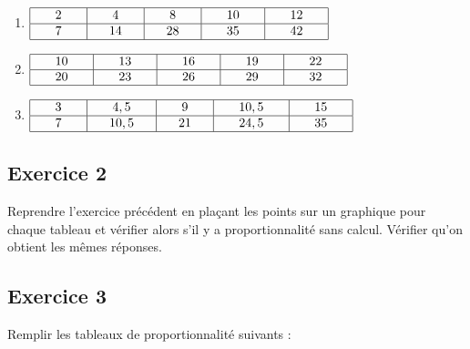 \documentclass[12 pt]{extarticle}
\theoremstyle{plain}
\begin{document}
\begin{enumerate}
\item $
\begin{array}{|c|c|c|c|c|}
\hline
\phantom{000}     2   \phantom{000} 
& \phantom{000}    4   \phantom{000} 
& \phantom{000}    8   \phantom{000} 
& \phantom{000}    10 \phantom{000} 
& \phantom{000}   12    \phantom{000}\\
\hline
 7 & 14  &28 & 35 & 42 \\
\hline
\end{array}$

\item $
\begin{array}{|c|c|c|c|c|}
\hline
\phantom{000}    10    \phantom{000} 
& \phantom{000}    13   \phantom{000} 
& \phantom{000}      16 \phantom{000} 
& \phantom{000}      19 \phantom{000} 
& 
\phantom{000}
22
\phantom{000}\\
\hline

20 & 23 & 26& 29&32 \\
\hline
\end{array}$

\item $
\begin{array}{|c|c|c|c|c|}
\hline
\phantom{000}     3   \phantom{000} 
& \phantom{000}    4,5   \phantom{000} 
& \phantom{000}     9  \phantom{000} 
& \phantom{000}      10,5 \phantom{000} 
& 
\phantom{000}
15
\phantom{000}\\
\hline

 7& 10,5 &21 &24,5 & 35\\
\hline
\end{array}$
\end{enumerate}

\subsection*{Exercice 2}
Reprendre l'exercice précédent en plaçant les points sur un graphique pour chaque tableau et vérifier alors 
s'il y a proportionnalité sans calcul.
Vérifier qu'on obtient les mêmes réponses.
\subsection*{Exercice 3}

Remplir les tableaux de proportionnalité suivants : 
\end{document}
